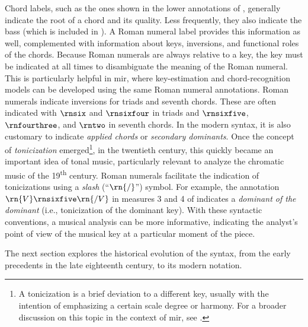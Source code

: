 

Chord labels, such as the ones shown in the lower
annotations of , generally indicate the root
of a chord and its quality. Less frequently, they also
indicate the bass (which is included in ). A
Roman numeral label provides this information as well,
complemented with information about keys, inversions, and
functional roles of the chords. Because Roman numerals are
always relative to a key, the key must be indicated at all
times to disambiguate the meaning of the Roman numeral. This
is particularly helpful in \gls{mir}, where key-estimation
and chord-recognition models can be developed using the same
Roman numeral annotations. Roman numerals indicate
inversions for triads and seventh chords. These are often
indicated with $\rnsix$ and $\rnsixfour$ in triads and
$\rnsixfive$, $\rnfourthree$, and $\rntwo$ in seventh
chords. In the modern syntax, it is also customary to
indicate \emph{applied chords} or \emph{secondary
dominants}. Once the concept of \emph{tonicization}
emerged\footnote{A tonicization is a brief deviation to a
different key, usually with the intention of emphasizing a
certain scale degree or harmony. For a broader discussion on
this topic in the context of \gls{mir}, see
\textcite{napoleslopez2020local}.}, in the twentieth
century, this quickly became an important idea of tonal
music, particularly relevant to analyze the chromatic music
of the 19\textsuperscript{th} century. Roman numerals
facilitate the indication of tonicizations using a
\emph{slash} (``$\rn{/}$'') symbol. For example, the
annotation $\rn{V}\rnsixfive\rn{/V}$ in measures 3 and 4 of
 indicates a \emph{dominant of the dominant}
(i.e., tonicization of the dominant key). With these
syntactic conventions, a musical analysis can be more
informative, indicating the analyst's point of view of the
musical key at a particular moment of the piece.

The next section explores the historical evolution of the
syntax, from the early precedents in the late eighteenth
century, to its modern notation.

